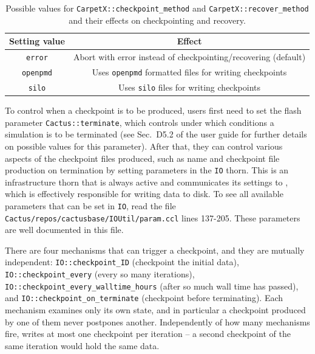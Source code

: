\begin{table}[hb]
  \centering
  \begin{tabular}{cc}
  Setting value    & Effect                                                         \\ \hline\hline
  \texttt{error}   & Abort with error instead of checkpointing/recovering (default) \\
  \texttt{openpmd} & Uses \texttt{openpmd} formatted files for writing checkpoints  \\
  \texttt{silo}    & Uses \texttt{silo} files for writing checkpoints               \\ \hline\hline
  \end{tabular}
  \caption{Possible values for \texttt{CarpetX::checkpoint\_method} and \texttt{CarpetX::recover\_method} and their effects on checkpointing and recovery.}
  \label{tab:checkpoint_recovery}
\end{table}


To control when a checkpoint is to be produced, users first need to set the flash parameter \texttt{Cactus::terminate}, which controls under which conditions a simulation is to be terminated (see Sec.~D5.2 of the \Cactus\space user guide for further details on possible values for this parameter). After that, they can control various aspects of the checkpoint files produced, such as name and checkpoint file production on termination by setting parameters in the \texttt{IO} thorn. This is an infrastructure thorn that is always active and communicates its settings to \CarpetX, which is effectively responsible for writing data to disk. To see all available parameters that can be set in \texttt{IO}, read the file \texttt{Cactus/repos/cactusbase/IOUtil/param.ccl} lines 137-205. These parameters are well documented in this file. 

There are four mechanisms that can trigger a checkpoint, and they are mutually independent: \texttt{IO::checkpoint\_ID} (checkpoint the initial data), \texttt{IO::checkpoint\_every} (every so many iterations), \texttt{IO::checkpoint\_every\_walltime\_hours} (after so much wall time has passed), and \texttt{IO::checkpoint\_on\_terminate} (checkpoint before terminating). Each mechanism examines only its own state, and in particular a checkpoint produced by one of them never postpones another. Independently of how many mechanisms fire, \CarpetX{} writes at most one checkpoint per iteration -- a second checkpoint of the same iteration would hold the same data.

